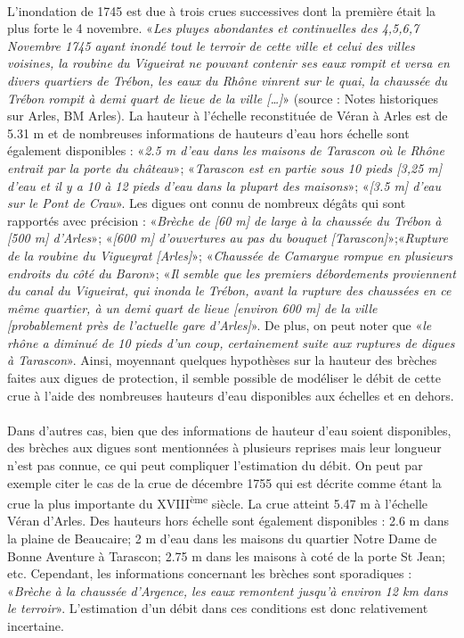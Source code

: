 	\paragraph{} L'inondation de 1745 est due à trois crues successives dont la première était la plus forte le 4 novembre. «\textit{Les pluyes abondantes et continuelles des 4,5,6,7 Novembre 1745 ayant inondé tout le terroir de cette ville et celui des villes voisines, la roubine du Vigueirat ne pouvant contenir ses eaux rompit et versa en divers quartiers de Trébon, les eaux du Rhône vinrent sur le quai, la chaussée du Trébon rompit à demi quart de lieue de la ville […]}» (source : Notes historiques sur Arles, BM Arles). La hauteur à l'échelle reconstituée de Véran à Arles est de 5.31 m et de nombreuses informations de hauteurs d'eau hors échelle sont également disponibles : «\textit{2.5 m d'eau dans les maisons de Tarascon où le Rhône entrait par la porte du château}»; «\textit{Tarascon est en partie sous 10 pieds [3,25 m] d'eau et il y a 10 à 12 pieds d'eau dans la plupart des maisons}»; «\textit{[3.5 m] d'eau sur le Pont de Crau}». Les digues ont connu de nombreux dégâts qui sont rapportés avec précision : «\textit{Brèche de [60 m] de large à la chaussée du Trébon à [500 m] d'Arles}»; «\textit{[600 m] d'ouvertures au pas du bouquet [Tarascon]}»;«\textit{Rupture de la roubine du Vigueyrat [Arles]}»; «\textit{Chaussée de Camargue rompue en plusieurs endroits du côté du Baron}»; «\textit{Il semble que les premiers débordements proviennent du canal du Vigueirat, qui inonda le Trébon, avant la rupture des chaussées en ce même quartier, à un demi quart de lieue [environ 600 m] de la ville [probablement près de l'actuelle gare d’Arles]}». De plus, on peut noter que «\textit{le rhône a diminué de 10 pieds d'un coup, certainement suite aux ruptures de digues à Tarascon}». Ainsi, moyennant quelques hypothèses sur la hauteur des brèches faites aux digues de protection, il semble possible de modéliser le débit de cette crue à l'aide des nombreuses hauteurs d'eau disponibles aux échelles et en dehors. 

	\paragraph{} Dans d'autres cas, bien que des informations de hauteur d'eau soient disponibles, des brèches aux digues sont mentionnées à plusieurs reprises mais leur longueur n'est pas connue, ce qui peut compliquer l'estimation du débit. On peut par exemple citer le cas de la crue de décembre 1755 qui est décrite comme étant la crue la plus importante du XVIII\textsuperscript{ème} siècle. La crue atteint 5.47 m à l'échelle Véran d'Arles. Des hauteurs hors échelle sont également disponibles : 2.6 m dans la plaine de Beaucaire; 2 m d'eau dans les maisons du quartier Notre Dame de Bonne Aventure à Tarascon; 2.75 m dans les maisons à coté de la porte St Jean; etc. Cependant, les informations concernant les brèches sont sporadiques : «\textit{Brèche à la chaussée d'Argence, les eaux remontent jusqu'à environ 12 km dans le terroir}». L'estimation d'un débit dans ces conditions est donc relativement incertaine.
  	
